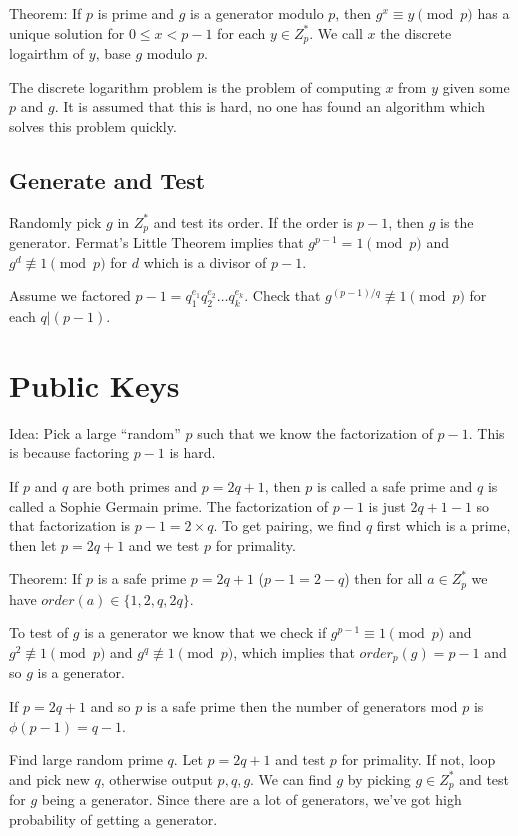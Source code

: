 \documentclass[psamsfonts]{amsart}
\begin{document}
Theorem: If $p$ is prime and $g$ is a generator modulo $p$, then $g^{x} \equiv y \pmod{p}$ has a unique solution for $0 \leq x < p -1$ for each $y \in Z_p^*$. We call $x$ the discrete logairthm of $y$, base $g$ modulo $p$.

The discrete logarithm problem is the problem of computing $x$ from $y$ given some $p$ and $g$. It is assumed that this is hard, no one has found an algorithm which solves this problem quickly.

\subsection{Generate and Test}

Randomly pick $g$ in $Z_{p}^*$ and test its order. If the order is $p-1$, then $g$ is the generator. Fermat's Little Theorem implies that $g^{p-1} = 1 \pmod{p}$ and $g^{d} \not \equiv 1 \pmod{p}$ for $d$ which is a divisor of $p-1$.

Assume we factored $p-1 = q_1^{e_1} q_2^{e_2} \ldots q_k^{e_k}$. Check that $g^{(p-1)/q} \not \equiv 1 \pmod{p}$ for each $q | (p-1)$.

\section{Public Keys}

Idea: Pick a large ``random'' $p$ such that we know the factorization of $p-1$. This is because factoring $p-1$ is hard.

If $p$ and $q$ are both primes and $p = 2q+1$, then $p$ is called a safe prime and $q$ is called a Sophie Germain prime. The factorization of $p-1$ is just $2q+1-1$ so that factorization is $p-1 = 2 \times q$. To get pairing, we find $q$ first which is a prime, then let $p = 2q + 1$ and we test $p$ for primality.

Theorem: If $p$ is a safe prime $p = 2q+1$ ($p-1 = 2-q$) then for all $a \in Z_p^*$ we have $order(a) \in \{1, 2, q, 2q\}$.

To test of $g$ is a generator we know that we check if $g^{p-1} \equiv 1 \pmod{p}$ and $g^2 \not \equiv 1 \pmod{p}$ and $g^q \not \equiv 1 \pmod{p}$, which implies that $order_p(g) = p-1$ and so $g$ is a generator.

If $p = 2q + 1$ and so $p$ is a safe prime then the number of generators mod $p$ is $\phi(p-1) = q-1$.

Find large random prime $q$. Let $p = 2q + 1$ and test $p$ for primality. If not, loop and pick new $q$, otherwise output $p,q,g$. We can find $g$ by picking $g \in Z_{p}^*$ and test for $g$ being a generator. Since there are a lot of generators, we've got high probability of getting a generator.
\end{document}
